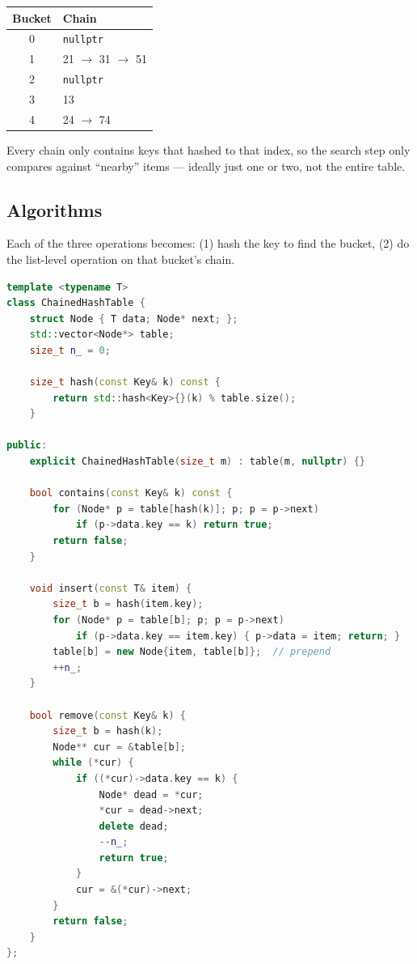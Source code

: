 \documentclass[11pt]{article}
\begin{document}
\begin{center}
\begin{tabular}{|c|l|}
\hline
\textbf{Bucket} & \textbf{Chain} \\
\hline
0 & \texttt{nullptr} \\
1 & 21 $\to$ 31 $\to$ 51 \\
2 & \texttt{nullptr} \\
3 & 13 \\
4 & 24 $\to$ 74 \\
\hline
\end{tabular}
\end{center}

Every chain only contains keys that hashed to that index, so the
search step only compares against ``nearby'' items --- ideally
just one or two, not the entire table.

\subsection*{Algorithms}

Each of the three operations becomes: (1) hash the key to find
the bucket, (2) do the list-level operation on that bucket's
chain.

\begin{examplebox}
\begin{lstlisting}[language=C++,basicstyle=\ttfamily\small,frame=single]
template <typename T>
class ChainedHashTable {
    struct Node { T data; Node* next; };
    std::vector<Node*> table;
    size_t n_ = 0;

    size_t hash(const Key& k) const {
        return std::hash<Key>{}(k) % table.size();
    }

public:
    explicit ChainedHashTable(size_t m) : table(m, nullptr) {}

    bool contains(const Key& k) const {
        for (Node* p = table[hash(k)]; p; p = p->next)
            if (p->data.key == k) return true;
        return false;
    }

    void insert(const T& item) {
        size_t b = hash(item.key);
        for (Node* p = table[b]; p; p = p->next)
            if (p->data.key == item.key) { p->data = item; return; }
        table[b] = new Node{item, table[b]};  // prepend
        ++n_;
    }

    bool remove(const Key& k) {
        size_t b = hash(k);
        Node** cur = &table[b];
        while (*cur) {
            if ((*cur)->data.key == k) {
                Node* dead = *cur;
                *cur = dead->next;
                delete dead;
                --n_;
                return true;
            }
            cur = &(*cur)->next;
        }
        return false;
    }
};
\end{lstlisting}
\end{examplebox}
\end{document}
